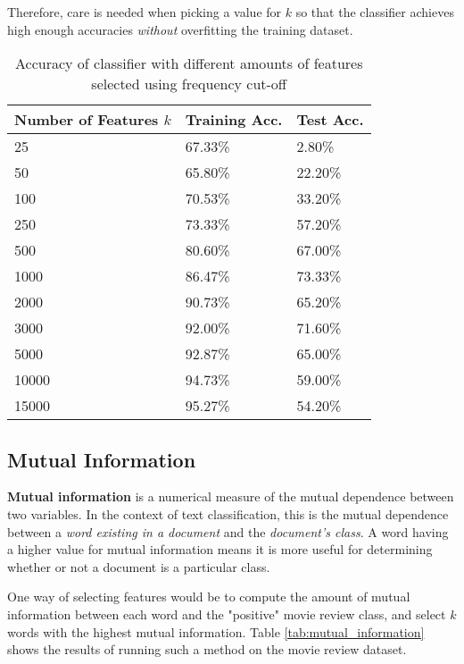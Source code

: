 \documentclass{article}
\begin{document}
Therefore, care is needed when picking a value for $k$ so that the classifier achieves high enough accuracies \textit{without} overfitting the training dataset.

\begin{table}
	\centering
	\begin{tabular}{|l|l|l|}
	\hline
	\textbf{Number of Features $k$} & \textbf{Training Acc.} & \textbf{Test Acc.} \\
	\hline
	25 & 67.33\% & 2.80\% \\
	50 & 65.80\% & 22.20\% \\
	100 & 70.53\% & 33.20\% \\
	250 & 73.33\% & 57.20\% \\
	500 & 80.60\% & 67.00\% \\
	1000 & 86.47\% & 73.33\% \\
	2000 & 90.73\% & 65.20\% \\
	3000 & 92.00\% & 71.60\% \\
	5000 & 92.87\% & 65.00\% \\
	10000 & 94.73\% & 59.00\% \\
	15000 & 95.27\% & 54.20\% \\
	\hline
	\end{tabular}
	\caption{Accuracy of classifier with different amounts of features selected using frequency cut-off}
	\label{tab:frequency_cutoff}
\end{table}

\subsection{Mutual Information}

\textbf{Mutual information} is a numerical measure of the mutual dependence between two variables. In the context of text classification, this is the mutual dependence between a \textit{word existing in a document} and the \textit{document's class}. A word having a higher value for mutual information means it is more useful for determining whether or not a document is a particular class.

One way of selecting features would be to compute the amount of mutual information between each word and the "positive" movie review class, and select $k$ words with the highest mutual information. Table \ref{tab:mutual_information} shows the results of running such a method on the movie review dataset. 
\end{document}
